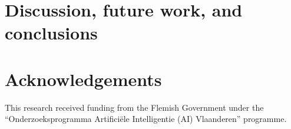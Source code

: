 \documentclass[3p]{elsarticle}
\begin{document}
\section{Discussion, future work, and conclusions}\label{sec:conclusion}

\section*{Acknowledgements}
This research received funding from the Flemish Government under the ``Onderzoeksprogramma Artifici\"ele Intelligentie (AI) Vlaanderen'' programme.




\end{document}
